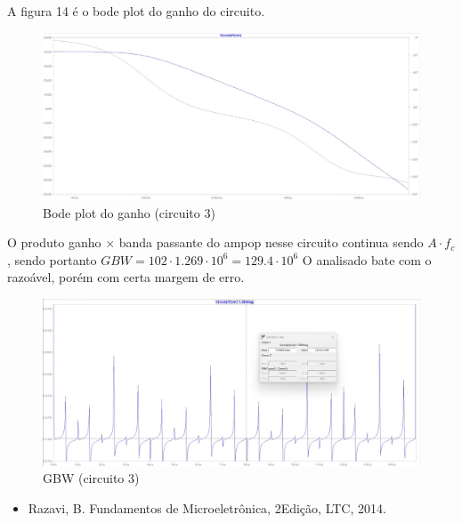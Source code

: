 \documentclass[10pt,twocolumn,letterpaper]{article}
\begin{document}
A figura 14 é o bode plot do ganho do circuito.

\begin{figure}[h]
\caption{Bode plot do ganho (circuito 3)}
\begin{center}
\includegraphics[scale=0.15]{figuras/fig14}
\end{center}
\end{figure}

\newpage
O produto ganho $\times$ banda passante do ampop nesse circuito continua sendo $A\cdot f_c$, sendo portanto $GBW = 102\cdot1.269\cdot10^6=129.4\cdot10^6$ O analisado bate com o razoável, porém com certa margem de erro. 

\begin{figure}[h]
\caption{GBW (circuito 3)}
\begin{center}
\includegraphics[scale=0.15]{figuras/fig15}
\end{center}
\end{figure}



{\small


}

\begin{itemize}
\item Razavi, B. Fundamentos de Microeletrônica, 2\textordfeminine Edição, LTC, 2014.
\end{itemize}
\end{document}
